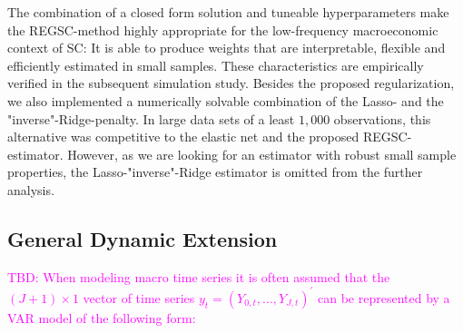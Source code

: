 The combination of a closed form solution and tuneable hyperparameters make the \ac{REGSC}-method highly appropriate for the low-frequency macroeconomic context of \ac{SC}: It is able to produce weights that are interpretable, flexible and efficiently estimated in small samples. These characteristics are empirically verified in the subsequent simulation study. Besides the proposed regularization, we also implemented a numerically solvable combination of the Lasso- and the "inverse"-Ridge-penalty. In large data sets of a least $1,000$ observations, this alternative was competitive to the elastic net and the proposed \ac{REGSC}-estimator. However, as we are looking for an estimator with robust small sample properties, the Lasso-"inverse"-Ridge estimator is omitted from the further analysis.

\subsection{General Dynamic Extension}
\textcolor{magenta}{
TBD: When modeling macro time series it is often assumed that the $(J+1) \times 1$ vector of time series $y_t = (Y_{0,t}, ..., Y_{J,t})^\prime$ can be represented by a \ac{VAR} model of the following form:
}






